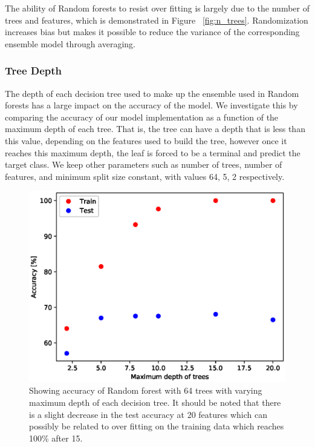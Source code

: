 \documentclass{article} %
\begin{document}
The ability of Random forests to resist over fitting is largely due to the number of trees and features, which is demonstrated in Figure ~\ref{fig:n_trees}. Randomization increases bias but makes it possible to reduce the variance of the corresponding ensemble model through averaging. \cite{formann-roe_2012}

\subsubsection{Tree Depth}

The depth of each decision tree used to make up the ensemble used in Random forests has a large impact on the accuracy of the model. We investigate this by comparing the accuracy of our model implementation as a function of the maximum depth of each tree. That is, the tree can have a depth that is less than this value, depending on the features used to build the tree, however once it reaches this maximum depth, the leaf is forced to be a terminal and predict the target class. We keep other parameters such as number of trees, number of features, and minimum split size constant, with values 64, 5, 2 respectively. 

\begin{figure}[ht]
\begin{center}
\includegraphics[scale=0.4]{max_depth}
\end{center}
\caption{Showing accuracy of Random forest with 64 trees with varying maximum depth of each decision tree. It should be noted that there is a slight decrease in the test accuracy at 20 features which can possibly be related to over fitting on the training data which reaches 100\% after 15.}
\label{fig:max_depth}
\end{figure}
\end{document}
